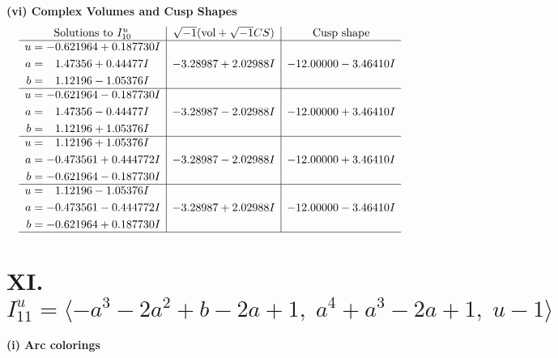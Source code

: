 \documentclass[1p]{elsarticle_modified}
\theoremstyle{definition}
\newcommand{\I}{\sqrt{-1}}
\begin{document}
\newpage\flushleft \textbf{(vi) Complex Volumes and Cusp Shapes}
$$\begin{array}{c|c|c}  
\text{Solutions to }I^u_{10}& \I (\text{vol} + \sqrt{-1}CS) & \text{Cusp shape}\\
 \hline 
\begin{aligned}
u &= -0.621964 + 0.187730 I \\
a &= \phantom{-}1.47356 + 0.44477 I \\
b &= \phantom{-}1.12196 - 1.05376 I\end{aligned}
 & -3.28987 + 2.02988 I & -12.00000 - 3.46410 I \\ \hline\begin{aligned}
u &= -0.621964 - 0.187730 I \\
a &= \phantom{-}1.47356 - 0.44477 I \\
b &= \phantom{-}1.12196 + 1.05376 I\end{aligned}
 & -3.28987 - 2.02988 I & -12.00000 + 3.46410 I \\ \hline\begin{aligned}
u &= \phantom{-}1.12196 + 1.05376 I \\
a &= -0.473561 + 0.444772 I \\
b &= -0.621964 - 0.187730 I\end{aligned}
 & -3.28987 - 2.02988 I & -12.00000 + 3.46410 I \\ \hline\begin{aligned}
u &= \phantom{-}1.12196 - 1.05376 I \\
a &= -0.473561 - 0.444772 I \\
b &= -0.621964 + 0.187730 I\end{aligned}
 & -3.28987 + 2.02988 I & -12.00000 - 3.46410 I\\
 \hline 
 \end{array}$$\newpage\newpage\renewcommand{\arraystretch}{1}
\centering \section*{XI. $I^u_{11}= \langle - a^3-2 a^2+b-2 a+1,\;a^4+a^3-2 a+1,\;u-1 \rangle$}
\flushleft \textbf{(i) Arc colorings}\\
\end{document}
